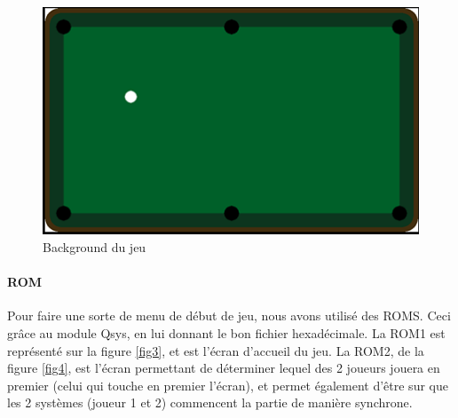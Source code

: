 \begin{figure}[!ht]
\centering
\includegraphics[scale=0.75]{img/background.png}
\caption{Background du jeu}
\label{fig2}
\end{figure}


\paragraph{ROM}

Pour faire une sorte de menu de début de jeu, nous avons utilisé des ROMS. Ceci grâce au module Qsys, en lui donnant le bon fichier hexadécimale. La ROM1 est représenté sur la figure \ref{fig3}, et est l'écran d’accueil du jeu. La ROM2, de la figure \ref{fig4}, est l'écran permettant de déterminer lequel des 2 joueurs jouera en premier (celui qui touche en premier l'écran), et  permet également d'être sur que les 2 systèmes (joueur 1 et 2) commencent la partie de manière synchrone.

